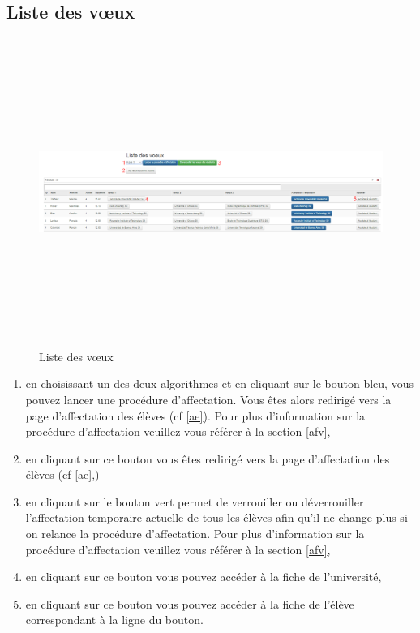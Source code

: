    \subsection{Liste des vœux}
   \label{lv}
   \begin{figure}[H]
   	\centering
   	\includegraphics[width=18cm,height=10cm]{Images/Admin/liste_voeux_admin.png}
   	\caption{Liste des vœux} 	
   \end{figure}
   \begin{enumerate}
   	\item en choisissant un des deux algorithmes et en cliquant sur le bouton bleu, vous pouvez lancer une procédure d'affectation. Vous êtes alors redirigé vers la page d'affectation des élèves (cf \ref{ae}). Pour plus d'information sur la procédure d'affectation veuillez vous référer à la section \ref{afv},
   	\item en cliquant sur ce bouton vous êtes redirigé vers la page d'affectation des élèves (cf \ref{ae},)
   	\item en cliquant sur le bouton vert permet de verrouiller ou déverrouiller l'affectation temporaire actuelle de tous les élèves afin qu'il ne change plus si on relance la procédure d'affectation. Pour plus d'information sur la procédure d'affectation veuillez vous référer à la section \ref{afv},
   	\item en cliquant sur ce bouton vous pouvez accéder à la fiche de l'université,
   	\item en cliquant sur ce bouton vous pouvez accéder à la fiche de l'élève correspondant à la ligne du bouton.
	\end{enumerate}
   
